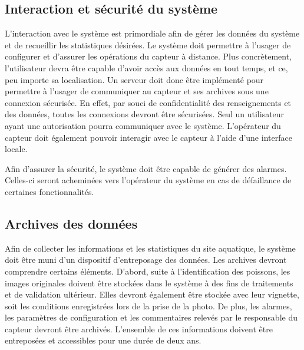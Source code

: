 
\subsection{Interaction et sécurité du système}

L'interaction avec le système est primordiale afin de gérer les données du système et de recueillir les statistiques désirées. Le système doit permettre à l'usager de configurer et d'assurer les opérations du capteur à distance. Plus concrètement, l'utilisateur devra être capable d'avoir accès aux données en tout temps, et ce, peu importe sa localisation. Un serveur doit donc être implémenté pour permettre à l'usager de communiquer au capteur et ses archives sous une connexion sécurisée. En effet, par souci de confidentialité des renseignements et des données, toutes les connexions devront être sécurisées. Seul un utilisateur ayant une autorisation pourra communiquer avec le système. L'opérateur du capteur doit également pouvoir interagir avec le capteur à l'aide d'une interface locale.

Afin d'assurer la sécurité, le système doit être capable de générer des alarmes. Celles-ci seront acheminées vers l'opérateur du système en cas de défaillance de certaines fonctionnalités. 

\subsection{Archives des données}

Afin de collecter les informations et les statistiques du site aquatique, le système doit être muni d'un dispositif d'entreposage des données. Les archives devront comprendre certains éléments. D'abord, suite à l'identification des poissons, les images originales doivent être stockées dans le système à des fins de traitements et de validation ultérieur. Elles devront également être stockée avec leur vignette, soit les conditions enregistrées lors de la prise de la photo. De plus, les alarmes, les paramètres de configuration et les commentaires relevés par le responsable du capteur devront être archivés. L'ensemble de ces informations doivent être entreposées et accessibles pour une durée de deux ans.

